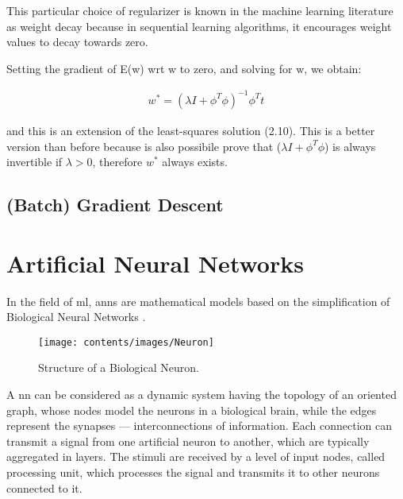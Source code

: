 \noindent This particular choice of regularizer is known in the machine learning literature as
weight decay because in sequential learning algorithms, it encourages weight values
to decay towards zero.

\noindent Setting the gradient of E(w) wrt w to zero, and solving for w, we obtain:

\begin{Equation}[H]
	\centering
		\begin{equation}
			\begin{aligned}
				w^* = (\lambda I + \phi^T \phi)^{-1} \phi^T t
			\end{aligned}
		\end{equation}
	\label{eq:mathmodelaada}
\end{Equation}

\noindent and this is an extension of the least-squares solution (2.10). This is a better version than before because is also possibile prove that ($\lambda I + \phi^T \phi$) is always invertible if $\lambda > 0$, therefore $w^*$ always exists.

\subsection{(Batch) Gradient Descent}
\label{subsec:batchgradientdescen}

\iffalse

\section{Artificial Neural Networks}
\label{sec:nn}
In the field of \gls{ml}, \glspl{ann} are mathematical models based on the 
simplification of Biological Neural Networks \cite[][]{zou2008overview}. 

\begin{figure}[htb]
	\centering
	\texttt{[image: contents/images/Neuron]}
	\caption{Structure of a Biological Neuron.}
	\label{fig:bioneuron}
\end{figure}

A \gls{nn} can be considered as a dynamic system having the topology of an 
oriented graph, whose nodes model the neurons in a biological brain, while the 
edges represent the synapses — interconnections of information.
Each connection can transmit a signal from one artificial neuron to another,
which are typically aggregated in layers. The stimuli are received by a level of 
input nodes, called processing unit, which processes the signal and transmits it to 
other neurons connected to it.

